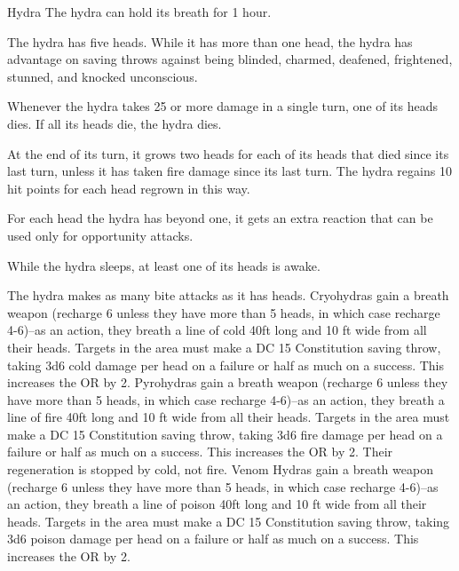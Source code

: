 \begin{DndMonster}{Hydra}
	\DndMonsterBasics[armor-class={15 (natural armor)}, hit-points={172 (15d12 + 75)}, speed={30 ft., swim 30 ft.}]
	\DndMonsterDetails[saving-throws={}, skills={Perception +6}, damage-immunities={}, damage-resistances={}, damage-vulnerabilities={}, condition-immunities={}, senses={darkvision 60 ft., passive Perception 16}, languages={—}, challenge={8:10}]
	 The hydra can hold its breath for 1 hour.
	
	 The hydra has five heads. While it has more than one head, the hydra has advantage on saving throws against being blinded, charmed, deafened, frightened, stunned, and knocked unconscious.
	
	Whenever the hydra takes 25 or more damage in a single turn, one of its heads dies. If all its heads die, the hydra dies.
	
	At the end of its turn, it grows two heads for each of its heads that died since its last turn, unless it has taken fire damage since its last turn. The hydra regains 10 hit points for each head regrown in this way.
	
	 For each head the hydra has beyond one, it gets an extra reaction that can be used only for opportunity attacks.
	
	 While the hydra sleeps, at least one of its heads is awake.
	
	 The hydra makes as many bite attacks as it has heads.
	\DndMonsterAttack[
		name=Bite,
		distance=melee,
		type=weapon,
		mod=+8,
		reach=10,
		dmg=\DndDice{1d10 + 5},
		dmg-type=piercing
	]
	 Cryohydras gain a breath weapon (recharge 6 unless they have more than 5 heads, in which case recharge 4-6)--as an action, they breath a line of cold 40ft long and 10 ft wide from all their heads. Targets in the area must make a DC 15 Constitution saving throw, taking 3d6 cold damage per head on a failure or half as much on a success. This increases the OR by 2.
	 Pyrohydras gain a breath weapon (recharge 6 unless they have more than 5 heads, in which case recharge 4-6)--as an action, they breath a line of fire 40ft long and 10 ft wide from all their heads. Targets in the area must make a DC 15 Constitution saving throw, taking 3d6 fire damage per head on a failure or half as much on a success. This increases the OR by 2. Their regeneration is stopped by cold, not fire.
	 Venom Hydras gain a breath weapon (recharge 6 unless they have more than 5 heads, in which case recharge 4-6)--as an action, they breath a line of poison 40ft long and 10 ft wide from all their heads. Targets in the area must make a DC 15 Constitution saving throw, taking 3d6 poison damage per head on a failure or half as much on a success. This increases the OR by 2.
\end{DndMonster}

